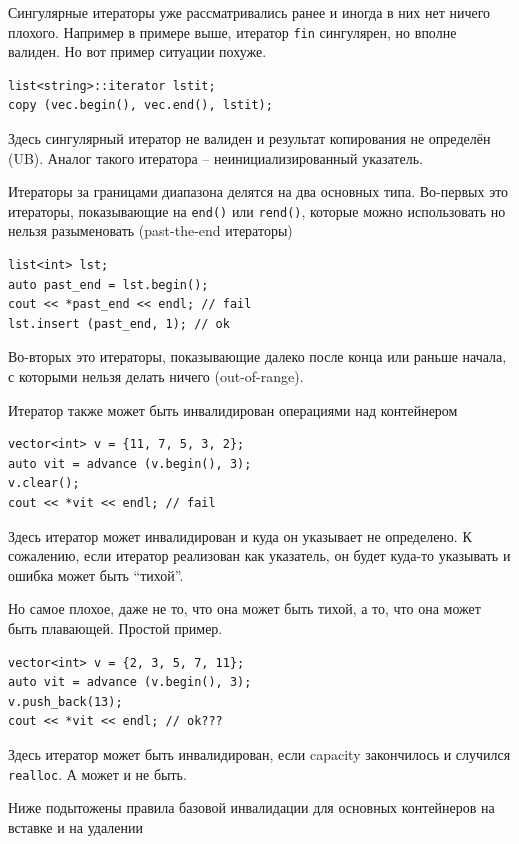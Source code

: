 \documentclass[a4paper,12pt,oneside]{book}
\begin{document}
Сингулярные итераторы уже рассматривались ранее и иногда в них нет ничего плохого. Например в примере выше, итератор \lstinline!fin! сингулярен, но вполне валиден. Но вот пример ситуации похуже.

\begin{lstlisting}
list<string>::iterator lstit;
copy (vec.begin(), vec.end(), lstit);
\end{lstlisting}

Здесь сингулярный итератор не валиден и результат копирования не определён (UB). Аналог такого итератора -- неинициализированный указатель.

Итераторы за границами диапазона делятся на два основных типа. Во-первых это итераторы, показывающие на \lstinline!end()! или \lstinline!rend()!, которые можно использовать но нельзя разыменовать (past-the-end итераторы) 

\begin{lstlisting}
list<int> lst;
auto past_end = lst.begin();
cout << *past_end << endl; // fail
lst.insert (past_end, 1); // ok
\end{lstlisting}

Во-вторых это итераторы, показывающие далеко после конца или раньше начала, с которыми нельзя делать ничего (out-of-range).

Итератор также может быть инвалидирован операциями над контейнером

\begin{lstlisting}
vector<int> v = {11, 7, 5, 3, 2};
auto vit = advance (v.begin(), 3);
v.clear();
cout << *vit << endl; // fail
\end{lstlisting}

Здесь итератор может инвалидирован и куда он указывает не определено. К сожалению, если итератор реализован как указатель, он будет куда-то указывать и ошибка может быть ``тихой''.

Но самое плохое, даже не то, что она может быть тихой, а то, что она может быть плавающей. Простой пример.

\begin{lstlisting}
vector<int> v = {2, 3, 5, 7, 11};
auto vit = advance (v.begin(), 3);
v.push_back(13);
cout << *vit << endl; // ok???
\end{lstlisting}

Здесь итератор может быть инвалидирован, если capacity закончилось и случился \lstinline!realloc!. А может и не быть.

Ниже подытожены правила базовой инвалидации для основных контейнеров на вставке и на удалении
\end{document}
